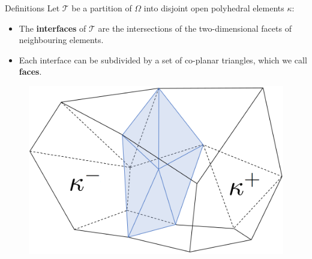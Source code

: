 \documentclass{beamer}
\begin{document}
\begin{frame}{Definitions}
	Let $\mathcal{T}$ be a partition of	$\Omega$ into disjoint open
	polyhedral elements $\kappa$:
	\begin{itemize}
		\item The \textbf{interfaces} of $\mathcal{T}$ are the intersections of
		the two-dimensional facets of neighbouring elements.
		\item Each interface can be subdivided by a set of co-planar triangles,
		which we call \textbf{faces}.
	\end{itemize}
	\begin{figure}
		\centering
		\includegraphics[scale=0.2]{polifacce}
	\end{figure}
\end{frame}
\end{document}
